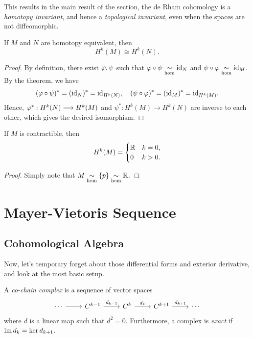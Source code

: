 This results in the main result of the section, the de Rham cohomology is a \emph{homotopy invariant}, and hence a \emph{topological invariant}, even when the spaces are not diffeomorphic.
\begin{corollary}
    If \(M\) and \(N\) are homotopy equivalent, then \[
        H^k(M)\cong H^k(N).
    \]
\end{corollary}
\begin{proof}
    By definition, there exist \(\varphi,\psi\) such that \(\varphi\circ\psi \underset{\mathrm{hom}}{\sim} \mathrm{id}_N\) and \(\psi\circ\varphi \underset{\mathrm{hom}}{\sim} \mathrm{id}_M\). By the theorem, we have \[
        (\varphi\circ\psi)^* = (\mathrm{id}_N)^* = \mathrm{id}_{H^k(N)},\quad
        (\psi\circ\varphi)^* = (\mathrm{id}_M)^* = \mathrm{id}_{H^k(M)}.
    \] Hence, \(\varphi^*:H^k(N)\longrightarrow H^k(M)\) and \(\psi^*:H^k(M)\longrightarrow H^k(N)\) are inverse to each other, which gives the desired isomorphism.
\end{proof}

\begin{corollary}
    If \(M\) is contractible, then \[
        H^k(M) = \begin{cases}
            \mathbb{R} & k = 0,\\
            0 & k > 0.
        \end{cases}
    \]
\end{corollary}
\begin{proof}
    Simply note that \(M\underset{\mathrm{hom}}{\sim}\{p\}\underset{\mathrm{hom}}{\sim} \mathbb{R}\).
\end{proof}


\section{Mayer-Vietoris Sequence}

\subsection*{Cohomological Algebra}

Now, let's temporary forget about those differential forms and exterior derivative, and look at the most basic setup.

\begin{definition}
    A \emph{co-chain complex} is a sequence of vector spaces \[
        \begin{tikzcd}
            \cdots \ar{r} & C^{k-1} \ar{r}{d_{k-1}} & C^k \ar{r}{d_k} & C^{k+1} \ar{r}{d_{k+1}} & \cdots
        \end{tikzcd}
    \] where \(d\) is a linear map such that \(d^2 = 0\). Furthermore, a complex is \emph{exact} if \(\operatorname{im} d_k = \ker d_{k+1}\).
\end{definition}

